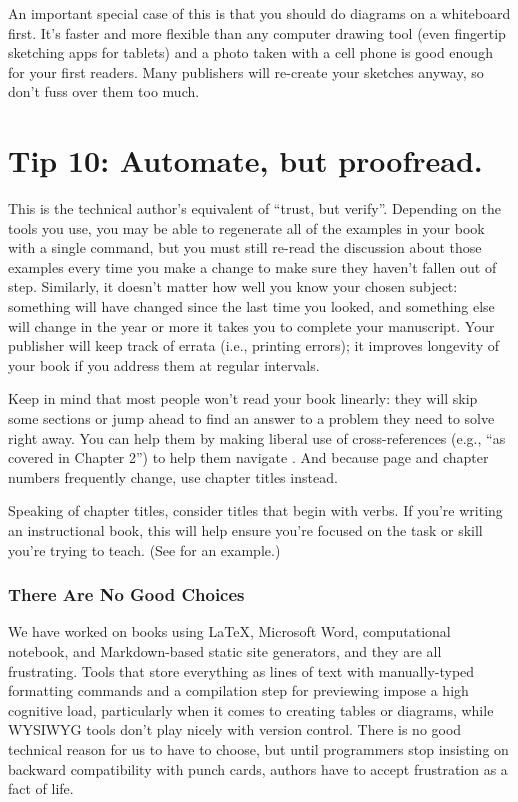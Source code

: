 \documentclass[10pt,letterpaper]{article}
\begin{document}
An important special case of this is that you should do diagrams on a whiteboard first.
It's faster and more flexible than any computer drawing tool
(even fingertip sketching apps for tablets)
and a photo taken with a cell phone is good enough for your first readers.
Many publishers will re-create your sketches anyway,
so don't fuss over them too much.

\section*{Tip 10: Automate, but proofread.}

This is the technical author's equivalent of ``trust, but verify''.
Depending on the tools you use,
you may be able to regenerate all of the examples in your book with a single command,
but you must still re-read the discussion about those examples every time you make a change
to make sure they haven't fallen out of step.
Similarly,
it doesn't matter how well you know your chosen subject:
something will have changed since the last time you looked,
and something else will change in the year or more it takes you to complete your manuscript.
Your publisher will keep track of errata (i.e., printing errors);
it improves longevity of your book if you address them at regular intervals.

Keep in mind that most people won't read your book linearly:
they will skip some sections or jump ahead to find an answer to a problem they need to solve right away.
You can help them by making liberal use of cross-references
(e.g., ``as covered in Chapter 2'') to help them navigate \cite{Li2020}.
And because page and chapter numbers frequently change, use chapter titles instead.

Speaking of chapter titles, consider titles that begin with verbs.
If you're writing an instructional book,
this will help ensure you're focused on the task or skill you're trying to teach.
(See \cite{Me2022} for an example.)

\subsubsection*{There Are No Good Choices}

We have worked on books using LaTeX, Microsoft Word, computational notebook,
and Markdown-based static site generators,
and they are all frustrating.
Tools that store everything as lines of text with manually-typed formatting commands
and a compilation step for previewing
impose a high cognitive load,
particularly when it comes to creating tables or diagrams,
while WYSIWYG tools don't play nicely with version control.
There is no good technical reason for us to have to choose,
but until programmers stop insisting on backward compatibility with punch cards,
authors have to accept frustration as a fact of life.
\end{document}
